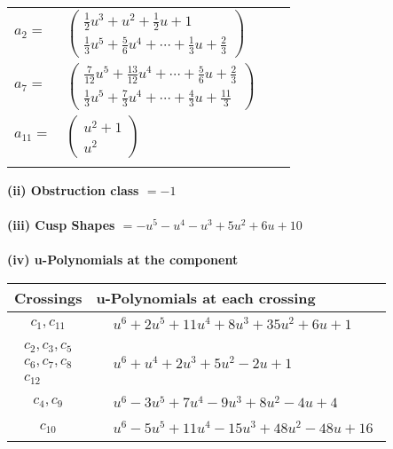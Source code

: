 \documentclass[1p]{elsarticle_modified}
\theoremstyle{definition}
\begin{document}
\begin{tabular}{m{7pt} m{180pt} m{7pt} m{180pt} }
\flushright $a_{2}=$&$\begin{pmatrix}\frac{1}{2} u^3+u^2+\frac{1}{2} u+1\\\frac{1}{3} u^5+\frac{5}{6} u^4+\cdots+\frac{1}{3} u+\frac{2}{3}\end{pmatrix}$ \\
\flushright $a_{7}=$&$\begin{pmatrix}\frac{7}{12} u^5+\frac{13}{12} u^4+\cdots+\frac{5}{6} u+\frac{2}{3}\\\frac{1}{3} u^5+\frac{7}{3} u^4+\cdots+\frac{4}{3} u+\frac{11}{3}\end{pmatrix}$ \\
\flushright $a_{11}=$&$\begin{pmatrix}u^2+1\\u^2\end{pmatrix}$\\&\end{tabular}
\flushleft \textbf{(ii) Obstruction class $= -1$}\\~\\
\flushleft \textbf{(iii) Cusp Shapes $= - u^5- u^4- u^3+5 u^2+6 u+10$}\\~\\
\newpage\renewcommand{\arraystretch}{1}
\flushleft \textbf{(iv) u-Polynomials at the component}\newline \\
\begin{tabular}{m{50pt}|m{274pt}}
Crossings & \hspace{64pt}u-Polynomials at each crossing \\
\hline $$\begin{aligned}c_{1},c_{11}\end{aligned}$$&$\begin{aligned}
&u^6+2 u^5+11 u^4+8 u^3+35 u^2+6 u+1
\end{aligned}$\\
\hline $$\begin{aligned}c_{2},c_{3},c_{5}\\c_{6},c_{7},c_{8}\\c_{12}\end{aligned}$$&$\begin{aligned}
&u^6+u^4+2 u^3+5 u^2-2 u+1
\end{aligned}$\\
\hline $$\begin{aligned}c_{4},c_{9}\end{aligned}$$&$\begin{aligned}
&u^6-3 u^5+7 u^4-9 u^3+8 u^2-4 u+4
\end{aligned}$\\
\hline $$\begin{aligned}c_{10}\end{aligned}$$&$\begin{aligned}
&u^6-5 u^5+11 u^4-15 u^3+48 u^2-48 u+16
\end{aligned}$\\
\hline
\end{tabular}\\~\\
\end{document}
